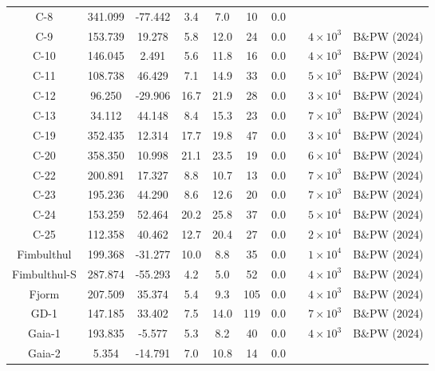 \begin{table}
\begin{tabular}{cSSSSSSccc}
C-8 & 341.099 & -77.442 & 3.4 & 7.0 & 10 & 0.0 & \citet{ibata:2021} & &  \\
C-9 & 153.739 & 19.278 & 5.8 & 12.0 & 24 & 0.0 & \citet{ibata:2023} & $4 \times 10^{3}$ & B\&PW (2024) \\
C-10 & 146.045 & 2.491 & 5.6 & 11.8 & 16 & 0.0 & \citet{ibata:2023} & $4 \times 10^{3}$ & B\&PW (2024) \\
C-11 & 108.738 & 46.429 & 7.1 & 14.9 & 33 & 0.0 & \citet{ibata:2023} & $5 \times 10^{3}$ & B\&PW (2024) \\
C-12 & 96.250 & -29.906 & 16.7 & 21.9 & 28 & 0.0 & \citet{ibata:2023} & $3 \times 10^{4}$ & B\&PW (2024) \\
C-13 & 34.112 & 44.148 & 8.4 & 15.3 & 23 & 0.0 & \citet{ibata:2023} & $7 \times 10^{3}$ & B\&PW (2024) \\
C-19 & 352.435 & 12.314 & 17.7 & 19.8 & 47 & 0.0 & \citet{ibata:2023} & $3 \times 10^{4}$ & B\&PW (2024) \\
C-20 & 358.350 & 10.998 & 21.1 & 23.5 & 19 & 0.0 & \citet{ibata:2023} & $6 \times 10^{4}$ & B\&PW (2024) \\
C-22 & 200.891 & 17.327 & 8.8 & 10.7 & 13 & 0.0 & \citet{ibata:2023} & $7 \times 10^{3}$ & B\&PW (2024) \\
C-23 & 195.236 & 44.290 & 8.6 & 12.6 & 20 & 0.0 & \citet{ibata:2023} & $7 \times 10^{3}$ & B\&PW (2024) \\
C-24 & 153.259 & 52.464 & 20.2 & 25.8 & 37 & 0.0 & \citet{ibata:2023} & $5 \times 10^{4}$ & B\&PW (2024) \\
C-25 & 112.358 & 40.462 & 12.7 & 20.4 & 27 & 0.0 & \citet{ibata:2023} & $2 \times 10^{4}$ & B\&PW (2024) \\
Fimbulthul & 199.368 & -31.277 & 10.0 & 8.8 & 35 & 0.0 & \citet{ibata:2023} & $1 \times 10^{4}$ & B\&PW (2024) \\
Fimbulthul-S & 287.874 & -55.293 & 4.2 & 5.0 & 52 & 0.0 & \citet{ibata:2023} & $4 \times 10^{3}$ & B\&PW (2024) \\
Fjorm & 207.509 & 35.374 & 5.4 & 9.3 & 105 & 0.0 & \citet{ibata:2023} & $4 \times 10^{3}$ & B\&PW (2024) \\
GD-1 & 147.185 & 33.402 & 7.5 & 14.0 & 119 & 0.0 & \citet{ibata:2023} & $7 \times 10^{3}$ & B\&PW (2024) \\
Gaia-1 & 193.835 & -5.577 & 5.3 & 8.2 & 40 & 0.0 & \citet{ibata:2023} & $4 \times 10^{3}$ & B\&PW (2024) \\
Gaia-2 & 5.354 & -14.791 & 7.0 & 10.8 & 14 & 0.0 & \citet{ibata:2021} & &  \\

\end{tabular}
\end{table}
